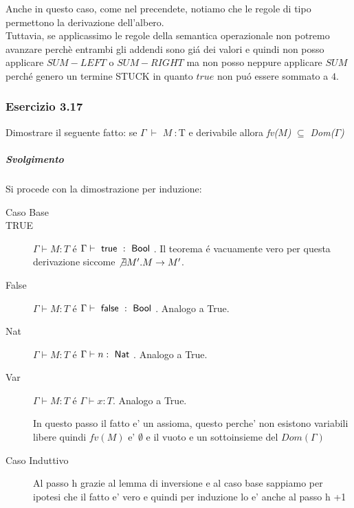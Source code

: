 Anche in questo caso, come nel precendete, notiamo che le regole di tipo permettono la derivazione dell'albero.\\
Tuttavia, se applicassimo le regole della semantica operazionale non potremo avanzare perch\`e entrambi gli addendi sono gi\'a dei valori e quindi non posso applicare $SUM-LEFT$ o $SUM-RIGHT$ ma non posso neppure applicare $SUM$ perch\'e genero un termine STUCK in quanto $true$ non pu\'o essere sommato a $4$.

\subsubsection*{Esercizio 3.17}

Dimostrare il seguente fatto: se $\Gamma\:\vdash$ $M\: :  $T e derivabile allora  \textit{fv($M$)}  $\subseteq$ \textit{Dom($\Gamma$)}
\subparagraph*{Svolgimento}

Si procede con la dimostrazione per induzione:

\begin{description}

\item[Caso Base]

\item[TRUE] $\Gamma \vdash{} M : T$ \'e $\Gamma \vdash{} \true{} :
  \Bool$.
  Il teorema \'e vacuamente vero per questa derivazione siccome
  $\not \exists{M'}. M \to{} M'$.
  
 \item[False]
  $\Gamma \vdash{} M : T$ \'e $\Gamma \vdash{} \false{} : \Bool$.
  Analogo a True.

\item[Nat]
  $\Gamma \vdash{} M : T$ \'e $\Gamma \vdash{} n : \Nat$. Analogo a True.

\item[Var] $\Gamma \vdash{} M : T$ \'e $\Gamma \vdash{} x : T$.
  Analogo a True.
  
 In questo passo il fatto e' un assioma, questo perche' non esistono variabili libere quindi $fv(M)$ e' $\emptyset$ e il vuoto e un sottoinsieme del $Dom(\Gamma)$

\item[Caso Induttivo]

Al passo h grazie al lemma di inversione e al caso base sappiamo per ipotesi che il fatto e' vero e quindi per induzione lo e' anche al passo h +1 

\end{description}

